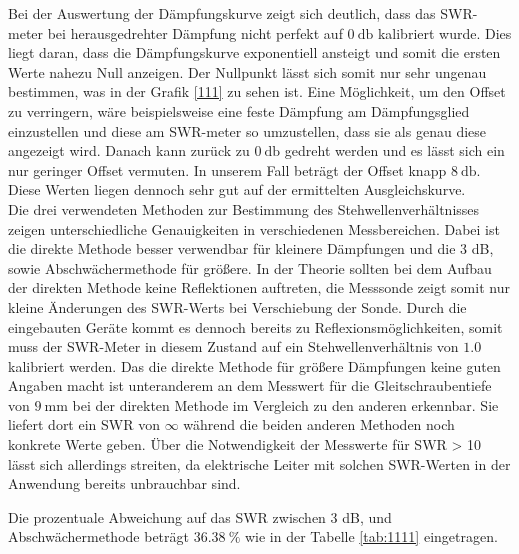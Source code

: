 \newline
Bei der Auswertung der Dämpfungskurve zeigt sich deutlich, dass das SWR-meter bei herausgedrehter Dämpfung nicht perfekt auf $\SI{0}{\decibel}$ kalibriert wurde. 
Dies liegt daran, dass die Dämpfungskurve exponentiell ansteigt und somit die ersten Werte nahezu Null anzeigen. Der Nullpunkt lässt sich somit nur sehr
ungenau bestimmen, was in der Grafik \ref{111} zu sehen ist. Eine Möglichkeit, um den Offset zu verringern, wäre beispielsweise eine feste Dämpfung am
Dämpfungsglied einzustellen und diese am SWR-meter so umzustellen, dass sie als genau diese angezeigt wird. Danach kann zurück zu $\SI{0}{\decibel}$ gedreht werden und
es lässt sich ein nur geringer Offset vermuten. 
In unserem Fall beträgt der Offset knapp $\SI{8}{\decibel}$. Diese Werten liegen dennoch sehr gut auf der ermittelten Ausgleichskurve.
\\ 
\newline
Die drei verwendeten Methoden zur Bestimmung des Stehwellenverhältnisses zeigen unterschiedliche Genauigkeiten in verschiedenen Messbereichen. Dabei ist die direkte Methode besser verwendbar
für kleinere Dämpfungen und die 3 dB, sowie Abschwächermethode für größere. In der Theorie sollten bei dem Aufbau der direkten Methode keine Reflektionen auftreten, die Messsonde zeigt somit nur kleine Änderungen des SWR-Werts bei Verschiebung der Sonde. Durch die eingebauten Geräte kommt es dennoch bereits zu Reflexionsmöglichkeiten, somit muss 
der SWR-Meter in diesem Zustand auf ein Stehwellenverhältnis von $\SI{1.0}{}$ kalibriert werden. Das die direkte Methode für größere Dämpfungen keine guten Angaben macht ist unteranderem an dem Messwert für die Gleitschraubentiefe von $\SI{9}{\milli\meter}$ 
bei der direkten Methode im Vergleich zu den anderen erkennbar. Sie liefert dort ein SWR von $\infty$ während die beiden anderen Methoden noch konkrete Werte geben. 
Über die Notwendigkeit der Messwerte für SWR > 10 lässt sich allerdings streiten, da elektrische Leiter mit solchen SWR-Werten in der Anwendung bereits unbrauchbar sind.
\\
\begin{flushleft}
Die prozentuale Abweichung auf das SWR zwischen 3 dB, und Abschwächermethode beträgt $\SI{36.38}{\percent}$ wie in der Tabelle \ref{tab:1111} eingetragen.
\end{flushleft}
